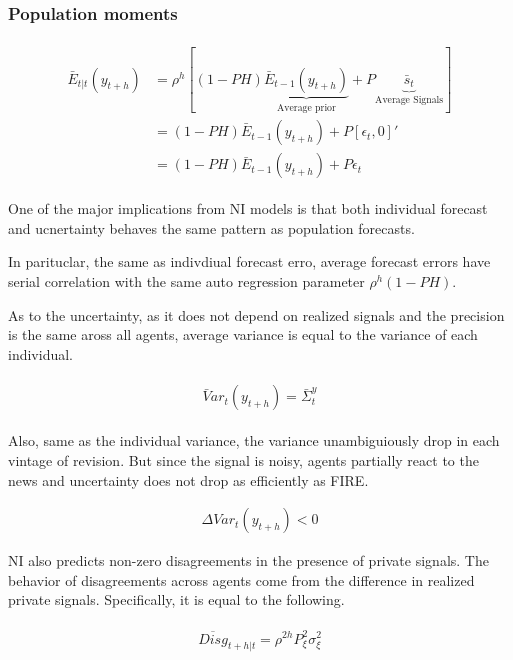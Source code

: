 \documentclass[]{article}
\begin{document}
\subsubsection{Population moments}

\begin{eqnarray}
\begin{aligned}
\bar E_{t|t} (y_{t+h}) & = \rho^h [(1-PH) \underbrace{\bar E_{t-1}(y_{t+h})}_{\text{Average prior}} + P \underbrace{\bar s_{t}}_{\text{Average Signals}}] \\
& = (1-PH) \bar E_{t-1}(y_{t+h}) + P [\epsilon_t, 0]' \\
& = (1-PH) \bar E_{t-1}(y_{t+h}) + P \epsilon_t
\end{aligned}
\end{eqnarray}

One of the major implications from NI models is that both individual forecast and ucnertainty behaves the same pattern as population forecasts. 

In parituclar, the same as indivdiual forecast erro, average forecast errors have serial correlation with the same auto regression parameter $\rho^h(1-PH)$. 

As to the uncertainty, as it does not depend on realized signals and the precision is the same aross all agents, average variance is equal to the variance of each individual. 

\begin{eqnarray}
\begin{aligned}
\bar Var_t (y_{t+h}) = \bar \Sigma^y_t
\end{aligned}
\end{eqnarray}

Also, same as the individual variance, the variance unambiguiously drop in each vintage of revision. But since the signal is noisy, agents partially react to the news and uncertainty does not drop as efficiently as FIRE. 

\begin{eqnarray}
\Delta Var_t(y_{t+h}) < 0 
\end{eqnarray}

NI also predicts non-zero disagreements in the presence of private signals. The behavior of disagreements across agents come from the difference in realized private signals. Specifically, it is equal to the following. 

\begin{eqnarray}
\begin{aligned}
\overline {Disg}_{t+h|t} = \rho^{2h} P^2_\xi \sigma^2_\xi  
\end{aligned}
\end{eqnarray}
\end{document}
